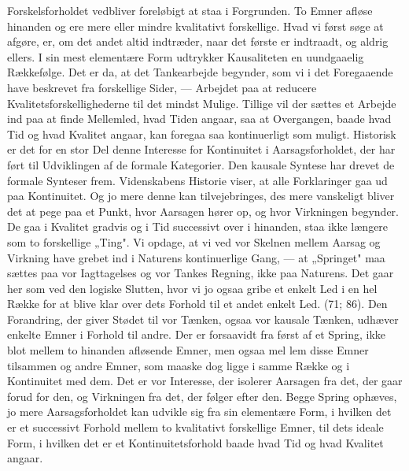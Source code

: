 \documentclass[12pt,a4paper]{book}
\newcommand{\opage}[1]{\marginnote{\footnotesize\textit{[#1]}}}
\begin{document}
Forskelsforholdet vedbliver foreløbigt at staa i Forgrunden. To Emner afløse
hinanden og ere mere eller mindre kvalitativt forskellige. Hvad vi først søge at
afgøre, er, om det andet altid indtræder, naar det første er indtraadt, og aldrig
ellers. I sin mest elementære Form udtrykker Kausaliteten en uundgaaelig
Rækkefølge. Det er da, at det Tankearbejde begynder, som vi i det Foregaaende have
beskrevet fra forskellige Sider, --- Arbejdet paa at reducere
Kvalitetsforskellighederne til det mindst Mulige. Tillige vil der sættes et
Arbejde ind paa at finde Mellemled, hvad Tiden angaar, saa at Overgangen, baade
hvad Tid og hvad Kvalitet angaar, kan foregaa saa kontinuerligt som muligt.
Historisk er det for en stor Del denne Interesse for Kontinuitet i
Aarsagsforholdet, der har ført til Udviklingen af de formale Kategorier. Den
kausale Syntese har drevet de formale Synteser frem. Videnskabens Historie viser,
at alle Forklaringer gaa ud paa Kontinuitet. Og jo mere denne kan tilvejebringes,
des mere vanskeligt bliver det at pege paa et Punkt, hvor Aarsagen hører op, og
hvor Virkningen begynder. De gaa i Kvalitet gradvis og i Tid successivt over i
hinanden, staa ikke længere som to forskellige „Ting". Vi opdage, at vi ved vor
Skelnen mellem Aarsag og Virkning have grebet ind i Naturens kontinuerlige Gang,
--- at „Springet" maa sættes paa vor Iagttagelses og vor Tankes Regning, ikke paa
Naturens. Det gaar her som ved den logiske Slutten, hvor vi jo ogsaa gribe et
enkelt Led i en hel Række for at blive klar over dets Forhold til et andet enkelt
Led. (71; 86). Den Forandring, der giver Stødet til vor Tænken, ogsaa vor kausale Tænken, udhæver
enkelte Emner i Forhold til andre. Der er forsaavidt fra først af et Spring, ikke
blot mellem to hinanden afløsende Emner, men ogsaa mel%
\opage{213}lem disse Emner tilsammen og
andre Emner, som maaske dog ligge i samme Række og i Kontinuitet med dem. Det er
vor Interesse, der isolerer Aarsagen fra det, der gaar forud for den, og
Virkningen fra det, der følger efter den. Begge Spring ophæves, jo mere
Aarsagsforholdet kan udvikle sig fra sin elementære Form, i hvilken det er et
successivt Forhold mellem to kvalitativt forskellige Emner, til dets ideale Form,
i hvilken det er et Kontinuitetsforhold baade hvad Tid og hvad Kvalitet angaar.
\end{document}
